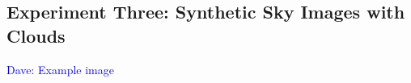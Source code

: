 \documentclass[11pt]{article}
\newcommand{\dnote}[1]{\textcolor{blue}{Dave: #1}}
\begin{document}
\subsection{Experiment Three: Synthetic Sky Images with Clouds}

\dnote{Example image}















\scriptsize{}
\end{document}
